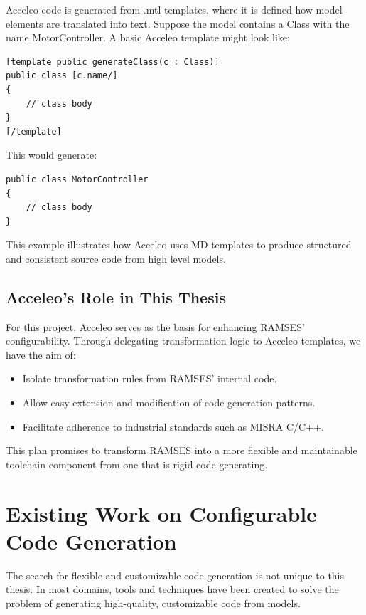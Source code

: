 Acceleo code is generated from .mtl templates, where it is defined how model elements are translated into text.
Suppose the model contains a Class with the name MotorController. A basic Acceleo template might look like:

\begin{verbatim}
[template public generateClass(c : Class)]
public class [c.name/]
{
	// class body
}
[/template]
\end{verbatim}

This would generate:

\begin{verbatim}
public class MotorController
{
	// class body
}
\end{verbatim}

This example illustrates how Acceleo uses \gls{MD} templates to produce structured and consistent source code from high level models.

\subsection{Acceleo’s Role in This Thesis}
\label{sec:role}

For this project, Acceleo serves as the basis for enhancing \gls{RAMSES}' configurability. Through delegating transformation logic to Acceleo templates, we have the aim of: 
\begin{itemize} 
	\item Isolate transformation rules from \gls{RAMSES}' internal code.
	\item Allow easy extension and modification of code generation patterns.
	\item Facilitate adherence to industrial standards such as \gls{MISRA} C/C++.
\end{itemize}

This plan promises to transform \gls{RAMSES} into a more flexible and maintainable toolchain component from one that is rigid code generating.


\section{Existing Work on Configurable Code Generation} \label{sec:configurable_generation}

The search for flexible and customizable code generation is not unique to this thesis. In most domains, tools and techniques have been created to solve the problem of generating high-quality, customizable code from models.

